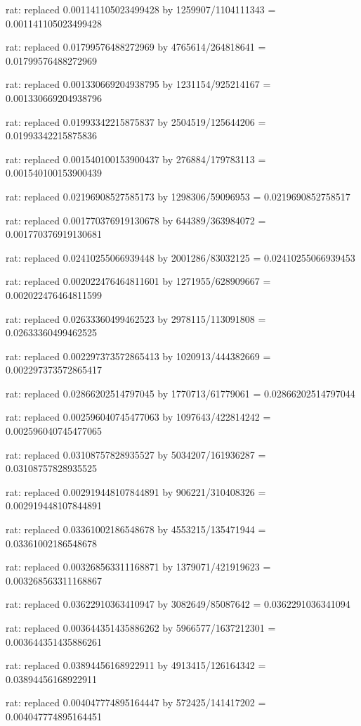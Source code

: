 \documentclass[a4paper,10pt]{article}
\begin{document}
\begin{eulernotebook}
\begin{eulercomment}
\begin{eulercomment}
\begin{eulercomment}
\begin{eulercomment}
\begin{eulercomment}
\begin{eulercomment}
\begin{eulercomment}
\begin{eulercomment}
\begin{eulercomment}
\begin{eulercomment}
\begin{eulercomment}
\begin{eulercomment}
\begin{eulercomment}
\begin{eulercomment}
\begin{eulercomment}
\begin{eulercomment}
\begin{euleroutput}
  rat: replaced 0.001141105023499428 by 1259907/1104111343 = 0.001141105023499428
  
  rat: replaced 0.01799576488272969 by 4765614/264818641 = 0.01799576488272969
  
  rat: replaced 0.001330669204938795 by 1231154/925214167 = 0.001330669204938796
  
  rat: replaced 0.01993342215875837 by 2504519/125644206 = 0.01993342215875836
  
  rat: replaced 0.001540100153900437 by 276884/179783113 = 0.001540100153900439
  
  rat: replaced 0.02196908527585173 by 1298306/59096953 = 0.0219690852758517
  
  rat: replaced 0.001770376919130678 by 644389/363984072 = 0.001770376919130681
  
  rat: replaced 0.02410255066939448 by 2001286/83032125 = 0.02410255066939453
  
  rat: replaced 0.002022476464811601 by 1271955/628909667 = 0.002022476464811599
  
  rat: replaced 0.02633360499462523 by 2978115/113091808 = 0.02633360499462525
  
  rat: replaced 0.002297373572865413 by 1020913/444382669 = 0.002297373572865417
  
  rat: replaced 0.02866202514797045 by 1770713/61779061 = 0.02866202514797044
  
  rat: replaced 0.002596040745477063 by 1097643/422814242 = 0.002596040745477065
  
  rat: replaced 0.03108757828935527 by 5034207/161936287 = 0.03108757828935525
  
  rat: replaced 0.002919448107844891 by 906221/310408326 = 0.002919448107844891
  
  rat: replaced 0.03361002186548678 by 4553215/135471944 = 0.03361002186548678
  
  rat: replaced 0.003268563311168871 by 1379071/421919623 = 0.003268563311168867
  
  rat: replaced 0.03622910363410947 by 3082649/85087642 = 0.0362291036341094
  
  rat: replaced 0.003644351435886262 by 5966577/1637212301 = 0.003644351435886261
  
  rat: replaced 0.03894456168922911 by 4913415/126164342 = 0.03894456168922911
  
  rat: replaced 0.004047774895164447 by 572425/141417202 = 0.004047774895164451
  

\end{euleroutput}
\end{eulercomment}
\end{eulercomment}
\end{eulercomment}
\end{eulercomment}
\end{eulercomment}
\end{eulercomment}
\end{eulercomment}
\end{eulercomment}
\end{eulercomment}
\end{eulercomment}
\end{eulercomment}
\end{eulercomment}
\end{eulercomment}
\end{eulercomment}
\end{eulercomment}
\end{eulercomment}
\end{eulernotebook}
\end{document}
